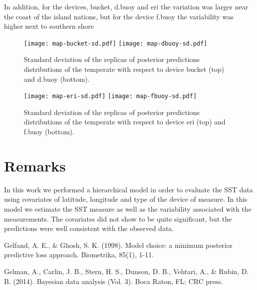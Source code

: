 \documentclass{asaproc}
\begin{document}
In addition, for the devices, bucket, d.buoy and eri the variation was larger near the coast of the island nations, but for the device f.buoy the variability was higher next to southern shore



\begin{figure}[H]
\centering
\texttt{[image: map-bucket-sd.pdf]}  
\texttt{[image: map-dbuoy-sd.pdf]} 
\caption{Standard deviation of the replicas of posterior predictions distributions of the temperate with respect to device bucket (top) and d.buoy (bottom).}
\label{maps-sd-1}
\end{figure}

\begin{figure}[H]
\centering
\texttt{[image: map-eri-sd.pdf]}
\texttt{[image: map-fbuoy-sd.pdf]} 
\caption{Standard deviation of the replicas of posterior predictions distributions of the temperate with respect to device eri (top) and f.buoy (bottom).}
\label{maps-sd-2}
\end{figure}

\section{Remarks}
In this work we performed a hierarchical model in order to evaluate the SST data using covariates of latitude, longitude and type of the device of measure. In this model we estimate the SST measure as well as the variability associated with the measurements. The covariates did not show to be quite significant, but the predictions were well consistent with the observed data.

\begin{references}
{\footnotesize
\itemsep=3pt
\item Gelfand, A. E., \& Ghosh, S. K. (1998). Model choice: a minimum posterior predictive loss approach. Biometrika, 85(1), 1-11.
\item Gelman, A., Carlin, J. B., Stern, H. S., Dunson, D. B., Vehtari, A., \& Rubin, D. B. (2014). Bayesian data analysis (Vol. 3). Boca Raton, FL: CRC press.

}

\end{references}
\end{document}
